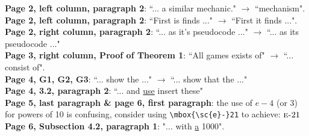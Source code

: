 \documentclass[11pt,a4paper,oneside,fleqn]{article}
\begin{document}
\textbf{Page 2, left column, paragraph 2}: ``... a similar mechanic." $\to$ ``mechanism". \\
\textbf{Page 2, left column, paragraph 2}: ``First is finds ..." $\to$ ``First it finds ...". \\
\textbf{Page 2, right column, paragraph 2}: ``... as it's pseudocode ..." $\to$ ``... as its pseudocode ..." \\
\textbf{Page 3, right column, Proof of Theorem 1}: ``All games exists of" $\to$ ``... consist of". \\
\textbf{Page 4, G1, G2, G3}: ``... show the ..." $\to$ ``... show that the ..." \\
\textbf{Page 4, 3.2, paragraph 2}: ``... and \underline{use} insert these" \\
\textbf{Page 5, last paragraph \& page 6, first paragraph}: the use of $e - 4$ (or 3) for powers of 10 is confusing, consider using \verb+\mbox{\sc{e}-}21+ to achieve: $\mbox{\sc{e}-}21$ \\
\textbf{Page 6, Subsection 4.2, paragraph 1}: "... with \underline{a} 1000".
\end{document}
